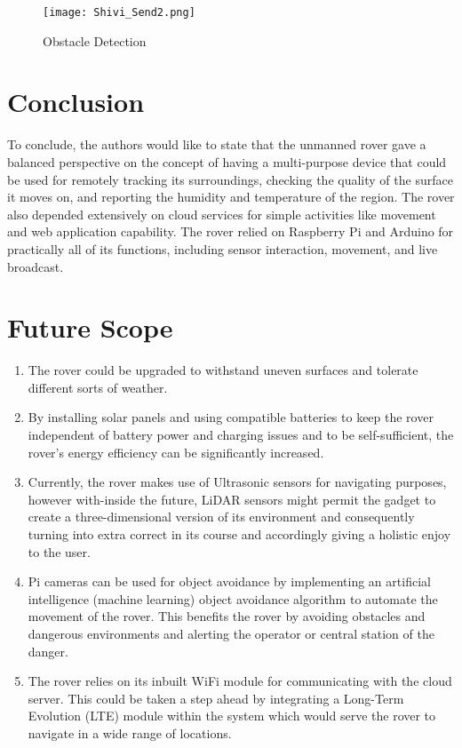 \documentclass[conference,a4paper]{IEEEtran}
\begin{document}
\begin{figure}[ht]
\centering
\texttt{[image: Shivi\_Send2.png]}
\caption{Obstacle Detection}
\label{Fig: Detection}
\end{figure}

\section{Conclusion}

To conclude, the authors would like to state that the unmanned rover gave a balanced perspective on the concept of having a multi-purpose device that could be used for remotely tracking its surroundings, checking the quality of the surface it moves on, and reporting the humidity and temperature of the region. The rover also depended extensively on cloud services for simple activities like movement and web application capability. 
The rover relied on Raspberry Pi and Arduino for practically all of its functions, including sensor interaction, movement, and live broadcast.

\section{Future Scope}
\begin{enumerate}
    \item The rover could be upgraded to withstand uneven surfaces and tolerate different sorts of weather.
    \item By installing solar panels and using compatible batteries to keep the rover independent of battery power and charging issues and to be self-sufficient, the rover's energy efficiency can be significantly increased.
    \item Currently, the rover makes use of Ultrasonic sensors for navigating purposes, however with-inside the future, LiDAR sensors might permit the gadget to create a three-dimensional version of its environment and consequently turning into extra correct in its course and accordingly giving a holistic enjoy to the user.
    \item Pi cameras can be used for object avoidance by implementing an artificial intelligence (machine learning) object avoidance algorithm to automate the movement of the rover. This benefits the rover by avoiding obstacles and dangerous environments and alerting the operator or central station of the danger.
    \item The rover relies on its inbuilt WiFi module for communicating with the cloud server. This could be taken a step ahead by integrating a Long-Term Evolution (LTE) module within the system which would serve the rover to navigate in a wide range of locations.
\end{enumerate}
\end{document}
